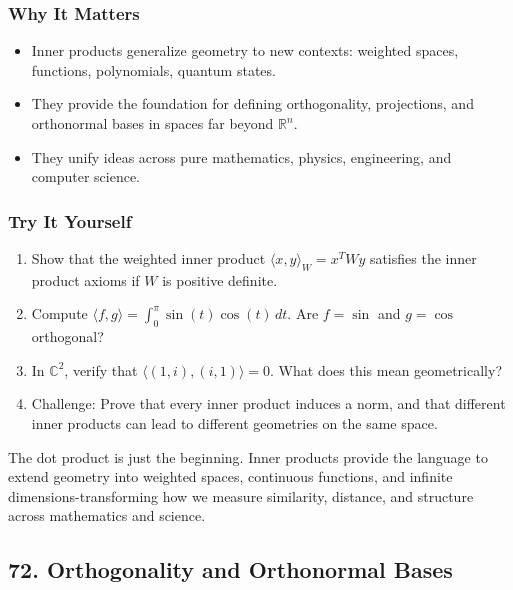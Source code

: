\documentclass[
  letterpaper,
  DIV=11,
  numbers=noendperiod]{scrreprt}
\providecommand{\tightlist}{%
  \setlength{\itemsep}{0pt}\setlength{\parskip}{0pt}}
\begin{document}
\subsubsection{Why It Matters}\label{why-it-matters-67}

\begin{itemize}
\tightlist
\item
  Inner products generalize geometry to new contexts: weighted spaces,
  functions, polynomials, quantum states.
\item
  They provide the foundation for defining orthogonality, projections,
  and orthonormal bases in spaces far beyond \(\mathbb{R}^n\).
\item
  They unify ideas across pure mathematics, physics, engineering, and
  computer science.
\end{itemize}

\subsubsection{Try It Yourself}\label{try-it-yourself-70}

\begin{enumerate}
\def\labelenumi{\arabic{enumi}.}
\tightlist
\item
  Show that the weighted inner product
  \(\langle x, y \rangle_W = x^T W y\) satisfies the inner product
  axioms if \(W\) is positive definite.
\item
  Compute \(\langle f, g \rangle = \int_0^\pi \sin(t)\cos(t)\, dt\). Are
  \(f=\sin\) and \(g=\cos\) orthogonal?
\item
  In \(\mathbb{C}^2\), verify that \(\langle (1,i), (i,1) \rangle = 0\).
  What does this mean geometrically?
\item
  Challenge: Prove that every inner product induces a norm, and that
  different inner products can lead to different geometries on the same
  space.
\end{enumerate}

The dot product is just the beginning. Inner products provide the
language to extend geometry into weighted spaces, continuous functions,
and infinite dimensions-transforming how we measure similarity,
distance, and structure across mathematics and science.

\subsection{72. Orthogonality and Orthonormal
Bases}\label{orthogonality-and-orthonormal-bases}
\end{document}
